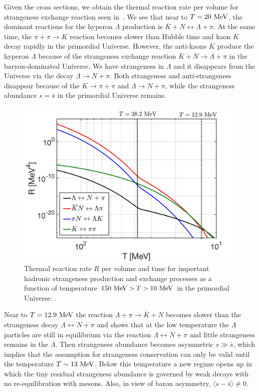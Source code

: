 Given the cross sections, we obtain the thermal reaction rate per volume for strangeness exchange reaction seen in~. We see that near to $T=20\text{ MeV}$, the dominant reactions for the hyperon $\Lambda$ production is $\overline{K}+N\leftrightarrow\Lambda+\pi$. At the same time, the $\pi+\pi\to K$ reaction becomes slower than Hubble time and kaon $K$ decay rapidly in the primordial Universe. However, the anti-kaons $\overline K$ produce the hyperon $\Lambda$ because of the strangeness exchange reaction $\overline{K}+N\rightarrow\Lambda+\pi$ in the baryon-dominated Universe. We have strangeness in $\Lambda$ and it disappears from the Universe via the decay $\Lambda\rightarrow N+\pi$. Both strangeness and anti-strangeness disappear because of the $K\rightarrow\pi+\pi$ and $\Lambda\rightarrow N+\pi$, while the strangeness abundance $s = \bar{s}$ in the primordial Universe remains.

\begin{figure} 
\centerline{\includegraphics[width=0.9\linewidth]{./plots/NewHyperonRate_C.jpg}}
\caption{Thermal reaction rate $R$ per volume and time for important hadronic strangeness production and exchange processes as a function of temperature $150\text{ MeV}> T>10\text{ MeV}$ in the primordial Universe. . }
\label{Lambda_Rate_volume.fig} 
\end{figure}

Near to $T=12.9\text{ MeV}$ the reaction $\Lambda+\pi\rightarrow\overline{K}+N$ becomes slower than the strangeness decay $\Lambda\leftrightarrow N+\pi$ and shows that at the low temperature the $\Lambda$ particles are still in equilibrium via the reaction $\Lambda\leftrightarrow N+\pi$ and little strangeness remains in the $\Lambda$. Then strangeness abundance becomes asymmetric $s\gg \bar{s}$, which implies that the assumption for strangeness conservation can only be valid until the temperature $T\sim13\text{ MeV}$. Below this temperature a new regime opens up in which the tiny residual strangeness abundance is governed by weak decays with no re-equilibration with mesons. Also, in view of baron asymmetry, $\langle s-\bar s\rangle \ne 0$.
